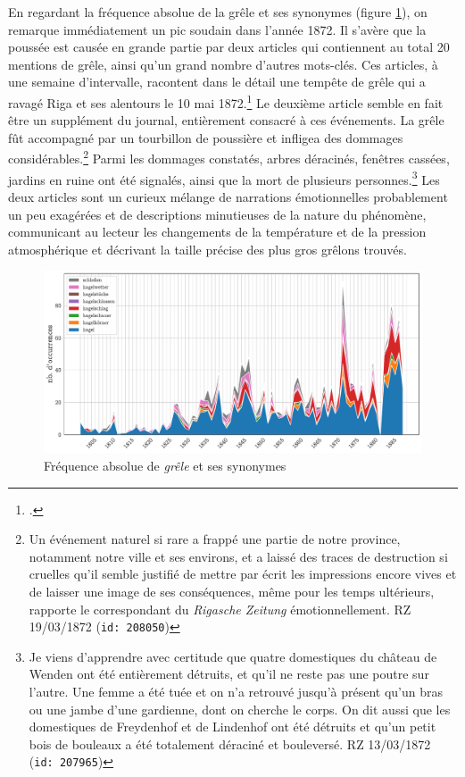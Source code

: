 \documentclass[a4paper,twoside,12pt]{article}
\begin{document}
En regardant la fréquence absolue de la grêle et ses synonymes (figure \ref{fig:hagel}), on remarque immédiatement un pic soudain dans l'année 1872. Il s'avère que la poussée est causée en grande partie par deux articles qui contiennent au total 20 mentions de grêle, ainsi qu'un grand nombre d'autres mots-clés. Ces articles, à une semaine d'intervalle, racontent dans le détail une tempête de grêle qui a ravagé Riga et ses alentours le 10 mai 1872.\footcite[Pour plus de détails sur cette tempête particulière, cf :][]{plath_kuidas_2021} Le deuxième article semble en fait être un supplément du journal, entièrement consacré à ces événements. La grêle fût accompagné par un tourbillon de poussière et infligea des dommages considérables.\footnote{\og Un événement naturel si rare a frappé une partie de notre province, notamment notre ville et ses environs, et a laissé des traces de destruction si cruelles qu'il semble justifié de mettre par écrit les impressions encore vives et de laisser une image de ses conséquences, même pour les temps ultérieurs, \fg{} rapporte le correspondant du \textit{Rigasche Zeitung} émotionnellement. RZ 19/03/1872 (\texttt{id: 208050})} Parmi les dommages constatés, arbres déracinés, fenêtres cassées, jardins en ruine ont été signalés, ainsi que la mort de plusieurs personnes.\footnote{\og Je viens d'apprendre avec certitude que quatre domestiques du château de Wenden ont été entièrement détruits, et qu'il ne reste pas une poutre sur l'autre. Une femme a été tuée et on n'a retrouvé jusqu'à présent qu'un bras ou une jambe d'une gardienne, dont on cherche le corps. On dit aussi que les domestiques de Freydenhof et de Lindenhof ont été détruits et qu'un petit bois de bouleaux a été totalement déraciné et bouleversé. \fg{} RZ 13/03/1872 (\texttt{id: 207965})} Les deux articles sont un curieux mélange de narrations émotionnelles probablement un peu exagérées et de descriptions minutieuses de la nature du phénomène, communicant au lecteur les changements de la température et de la pression atmosphérique et décrivant la taille précise des plus gros grêlons trouvés.

\begin{figure}[h]
    \centering
    \includegraphics[width=\textwidth]{images/hagel.pdf}
    \caption{Fréquence absolue de \textit{grêle} et ses synonymes}
    \label{fig:hagel}
\end{figure}
\end{document}
